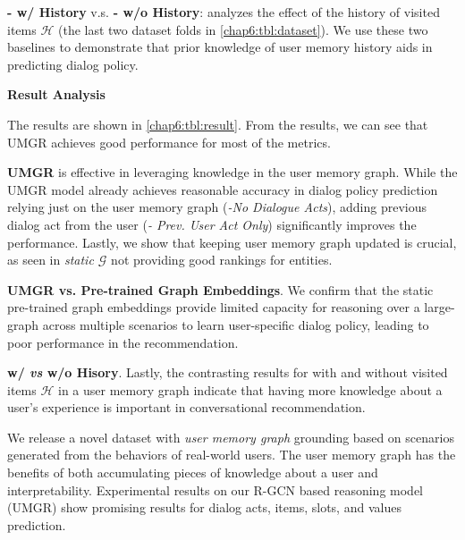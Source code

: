 \noindent \textbf{- w/ History} v.s. \textbf{- w/o History}: analyzes the effect of the history of visited items $\mathcal{H}$ (the last two dataset folds in \ref{chap6:tbl:dataset}). We use these two baselines to demonstrate that prior knowledge of user memory history aids in predicting dialog policy.


\textbf{Result Analysis}

The results are shown in \ref{chap6:tbl:result}. From the results, we can see that UMGR achieves good performance for most of the metrics.

\noindent \textbf{UMGR} is effective in leveraging knowledge in the user memory graph.
While the UMGR model already achieves reasonable accuracy in dialog policy prediction relying just on the user memory graph (\textit{-No Dialogue Acts}),
adding previous dialog act from the user (\textit{- Prev. User Act Only}) significantly improves the performance.
Lastly, we show that keeping user memory graph updated is crucial, as seen in \textit{static $\mathcal{G}$} not providing good rankings for entities.  

\noindent \textbf{UMGR vs. Pre-trained Graph Embeddings}. We confirm that the static pre-trained graph embeddings provide limited capacity for reasoning over a large-graph across multiple scenarios to learn user-specific dialog policy, leading to poor performance in the recommendation.

\noindent \textbf{w/ \textit{vs} w/o Hisory}. Lastly, the contrasting results for with and without visited items $\mathcal{H}$ in a user memory graph indicate that having more knowledge about a user's experience is important in conversational recommendation.

We release a novel dataset with \textit{user memory graph} grounding based on scenarios generated from the behaviors of real-world users.
The user memory graph has the benefits of both accumulating pieces of knowledge about a user and interpretability.
Experimental results on our R-GCN based reasoning model (UMGR) show promising results for dialog acts, items, slots, and values prediction.

